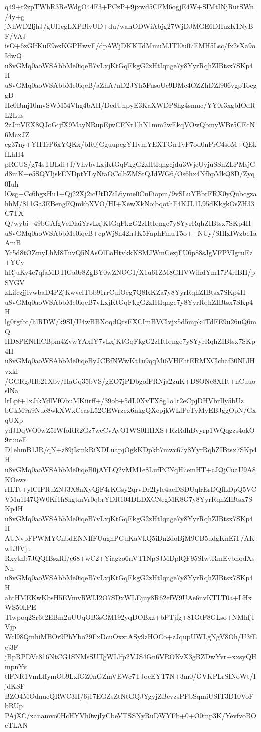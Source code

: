 q49+r2zpTWhR3ReWdgO44F3+PCzP+9jxwd5CFM6ogjE4W+SIMtINjRutSWn/4y+g
jNhWD2ljhJ/gUl1egLXPBlvUD+du/wanODWiAbjg27WjDJMGE6DHuzK1NyBF/VAJ
isO+6zGIfKuE9exKGPHwvF/dpAWjDKKTdMmuMJTI0u07EMH5Lsc/fx2sXa9oIdwQ
u8vGMq0aoWSAbbMe0iqeB7vLxjKtGqFkgG2zHtIqnge7y8YyrRqhZIBtsx7SKp4H
u8vGMq0aoWSAbbMe0iqeB/aZhA/nD2JYh5FusoUc9DMc4OZZhDZf906vgpTocggD
Hc0Bmj10mvSWM54Vhg4bAH/DedUhpyE3KaXWDP8hg4smuc/YY0r3xgbIOdRL2Lus
2zJmVEX8QJoGijfX9MayNRupEjwCFNr1lhN1mm2wEkqVOwQbmyWBr5CEcN6McxJZ
cg37ny+YHTrP6xYQKx/bR0jGguupegYHvmYEXTGnTyP7od0nPrC4soM+QEkfLhH4
pRCUS/g74sTBLdi+f/VhvbvLxjKtGqFkgG2zHtIqngcjdu3WjeUyjuSSnZLPMsjG
d8mK+e5SQYIjskENDptYLyNfaOCclbZMStQJdWG6/Os6hx4NfbpMkQ8D/Zyq0Iuh
lOsg+Cc6hgxHu1+Qj22Xj2icUtDZiL6yme0CuFiopm/9vSLuYBbrFRX0yQubcgza
hhM/811Ga3EBengFQmkbXVO/HI+XewXkNoibqothF4KJL1L95dKkgkOsZH33C7TX
Q/wybi+49bGAfgVeDlaiYrvLxjKtGqFkgG2zHtIqnge7y8YyrRqhZIBtsx7SKp4H
u8vGMq0aoWSAbbMe0iqeB+cpWj8n42nJK5FaphFmuT5o++NUy/SHlxIWzbe1aAmB
Yc5d8tOZmyLhM8TuvQ5NAsOlEoHtvkkKSMJWmCezjFU6p88sJgVFPVIgruEz+YCy
hRjuKv4e7qfaMDTlGa0r8ZgBY0wZNOGI/X1u61ZM8GHVWihdYm17P4rIBH/pSYGV
zLifczjjlvwbaD4PZjKwvclTbb91rrCufOeg7Q8KKZa7y8YyrRqhZIBtsx7SKp4H
u8vGMq0aoWSAbbMe0iqeB7vLxjKtGqFkgG2zHtIqnge7y8YyrRqhZIBtsx7SKp4H
lg0tgfbt/hlRDW/k9SI/U4wBBXoqdQrsFXCImBVClvjx5d5mpk4TdEE9u26uQ6mQ
HD8PENHlCBpm4ZvwYAxIY7vLxjKtGqFkgG2zHtIqnge7y8YyrRqhZIBtsx7SKp4H
u8vGMq0aoWSAbbMe0iqeByJCBfNWwKt1u9qqMi6VHFhtERMXClchaf30NLIHvxkl
/GGRgJHb21Xby/HaGq35bVS/gEO7jPDbgofFRNja2zuK+D8ONc8XHt+nCuuoslNa
lrLpf+1xJikYdlVfObuMKiirff+/39ob+5dL0XvTX8g1o1r2eCpjDHVbrIly5bUz
bGkM9a9Nuc8wkXWxCeasL52CEWrzcx6nkgQXepjkWLlPeTyMyEBJggOpN/GxqUXp
ydJDqWO0wZ5IWfoRR2Gz7weCvAyO1WS0HHXS+RzRdhBvyrp1WQqgzs4okO9ruueE
D1ehmB1JR/qN+z89jIsmkRiXDLuapjOgkKDpkb7mwc67y8YyrRqhZIBtsx7SKp4H
u8vGMq0aoWSAbbMe0iqeB0jAYLQ2vMM1e8LufPCNqH7emHT+cJQjCuaU9A8KOews
rILTt+ylCIPRuZNJ3X8nXyQjF4rKGsy2qrvDr2Iyle4acDSDUqlrErDQfLDpQ5VC
VMu1I47QW0Kf1h8kgtmVr0qbrYDR104DLDXCNegMK8G7y8YyrRqhZIBtsx7SKp4H
u8vGMq0aoWSAbbMe0iqeB7vLxjKtGqFkgG2zHtIqnge7y8YyrRqhZIBtsx7SKp4H
AUNvpFPWMYCnbdENNIfFUughPGuKaVkQ5iDn2doBjM9CB5udgKnEiT/AKwL3lVju
Rxytnb7JQQIBszRf/c68+wC2+Yiagzo6nVT1NpSJMDplQF95SIwtRmEvbnodXsNn
u8vGMq0aoWSAbbMe0iqeB7vLxjKtGqFkgG2zHtIqnge7y8YyrRqhZIBtsx7SKp4H
ahtHMEKwKbsH5EVmvRWIJ2O7SDxWLEjuy8R62efW9UAe6nvKTLT0a+LHxWS50kPE
Tlwpoq2Sr6t2EBm2uUUqOB3sGM192yqDOBxz+bPTjfg+81GtF8GLso+NMhfjlVjp
Wcl98QmhiMBOr9PbYbo29FxDcuOxztASy9zHOCo+zJqupUWLgNgV8Oh/U3fEej3F
jBpRPDVc816NtCG1SNMsSUTgWLlfp2VJS4Gn6VROKvX3gBZDwYvr+xxsyQHmpnYv
tlFNR1VmLffymOb9LxfGZ0nGZmVEWc7TJocEYT7N+3m0/GVKPLrSINoWt/IjdKSF
BZO4MOdnueQRWC3H/6j17EGZsZtNtGQJYgyjZBcvzsPPbSqmiUSIT3D10VoFbRUp
PAjXC/xanamvo0HcHYVh0wjIyCbeVTSSNyRuDWYFb+0+O0mp3K/YevfvoBOcTLAN
